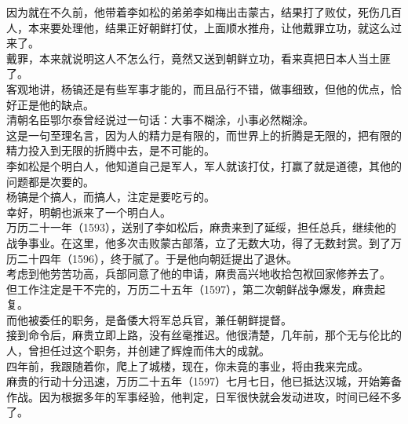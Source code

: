 \begin{multicols}{\theparacolNo}
因为就在不久前，他带着李如松的弟弟李如梅出击蒙古，结果打了败仗，死伤几百人，本来要处理他，结果正好朝鲜打仗，上面顺水推舟，让他戴罪立功，就这么过来了。\\

戴罪，本来就说明这人不怎么行，竟然又送到朝鲜立功，看来真把日本人当土匪了。\\

客观地讲，杨镐还是有些军事才能的，而且品行不错，做事细致，但他的优点，恰好正是他的缺点。\\

清朝名臣鄂尔泰曾经说过一句话：大事不糊涂，小事必然糊涂。\\

这是一句至理名言，因为人的精力是有限的，而世界上的折腾是无限的，把有限的精力投入到无限的折腾中去，是不可能的。\\

李如松是个明白人，他知道自己是军人，军人就该打仗，打赢了就是道德，其他的问题都是次要的。\\

杨镐是个搞人，而搞人，注定是要吃亏的。\\

幸好，明朝也派来了一个明白人。\\

万历二十一年（1593），送别了李如松后，麻贵来到了延绥，担任总兵，继续他的战争事业。在这里，他多次击败蒙古部落，立了无数大功，得了无数封赏。到了万历二十四年（1596），终于腻了。于是他向朝廷提出了退休。\\

考虑到他劳苦功高，兵部同意了他的申请，麻贵高兴地收拾包袱回家修养去了。\\

但工作注定是干不完的，万历二十五年（1597），第二次朝鲜战争爆发，麻贵起复。\\

而他被委任的职务，是备倭大将军总兵官，兼任朝鲜提督。\\

接到命令后，麻贵立即上路，没有丝毫推迟。他很清楚，几年前，那个无与伦比的人，曾担任过这个职务，并创建了辉煌而伟大的成就。\\

四年前，我跟随着你，爬上了城楼，现在，你未竟的事业，将由我来完成。\\

麻贵的行动十分迅速，万历二十五年（1597）七月七日，他已抵达汉城，开始筹备作战。因为根据多年的军事经验，他判定，日军很快就会发动进攻，时间已经不多了。\\


\end{multicols}
